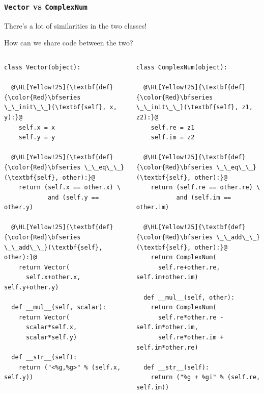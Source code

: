 \documentclass[english,serif,mathserif,xcolor=pdftex,dvipsnames,table]{beamer}
\begin{document}
\begin{frame}[fragile]
  \frametitle{\texttt{Vector} vs \texttt{ComplexNum}}

  There's a lot of similarities in the two classes!

  How can we share code between the two?

  \begin{columns}[t]
    \begin{column}{0.5\textwidth}
\begin{lstlisting}[basicstyle=\tiny\ttfamily,showstringspaces=false]
class Vector(object):

  @\HL[Yellow!25]{\textbf{def} {\color{Red}\bfseries \_\_init\_\_}(\textbf{self}, x, y):}@
    self.x = x
    self.y = y

  @\HL[Yellow!25]{\textbf{def} {\color{Red}\bfseries \_\_eq\_\_}(\textbf{self}, other):}@
    return (self.x == other.x) \
            and (self.y == other.y)

  @\HL[Yellow!25]{\textbf{def} {\color{Red}\bfseries \_\_add\_\_}(\textbf{self}, other):}@
    return Vector(
      self.x+other.x, self.y+other.y)

  def __mul__(self, scalar):
    return Vector(
      scalar*self.x,
      scalar*self.y)

  def __str__(self):
    return ("<%g,%g>" % (self.x, self.y))
\end{lstlisting}
    \end{column}
    \begin{column}{0.5\textwidth}
\begin{lstlisting}[basicstyle=\tiny\ttfamily,showstringspaces=false]
class ComplexNum(object):

  @\HL[Yellow!25]{\textbf{def} {\color{Red}\bfseries \_\_init\_\_}(\textbf{self}, z1, z2):}@
    self.re = z1
    self.im = z2

  @\HL[Yellow!25]{\textbf{def} {\color{Red}\bfseries \_\_eq\_\_}(\textbf{self}, other):}@
    return (self.re == other.re) \
           and (self.im == other.im)

  @\HL[Yellow!25]{\textbf{def} {\color{Red}\bfseries \_\_add\_\_}(\textbf{self}, other):}@
    return ComplexNum(
      self.re+other.re, self.im+other.im)

  def __mul__(self, other):
    return ComplexNum(
      self.re*other.re - self.im*other.im,
      self.re*other.im + self.im*other.re)

  def __str__(self):
    return ("%g + %gi" % (self.re, self.im))
\end{lstlisting}
    \end{column}
  \end{columns}
\end{frame}
\end{document}
